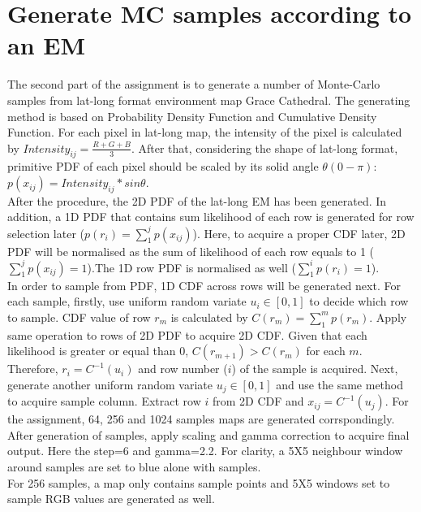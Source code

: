 \documentclass[12pt,twoside]{article}
\begin{document}
\newpage

\section{Generate MC samples according to an EM}
The second part of the assignment is to generate a number of Monte-Carlo samples from lat-long format environment map Grace Cathedral. The generating method is based on Probability Density Function and Cumulative Density Function. For each pixel in lat-long map, the intensity of the pixel is calculated by $Intensity_{ij} = \frac{R+G+B}{3}$. After that, considering the shape of lat-long format, primitive PDF of each pixel should be scaled by its solid angle $\theta (0-\pi)$: $p(x_{ij}) = Intensity_{ij} * sin\theta$. \\
After the procedure, the 2D PDF of the lat-long EM has been generated. In addition, a 1D PDF that contains sum likelihood of each row is generated for row selection later ($p(r_i) = \sum_1^jp(x_{ij})$). Here, to acquire a proper CDF later, 2D PDF will be normalised as the sum of likelihood of each row equals to 1 ($\sum_1^jp(x_{ij})=1$).The 1D row PDF is normalised as well ($\sum_1^ip(r_{i})=1$).\\
In order to sample from PDF, 1D CDF across rows will be generated next. For each sample, firstly, use uniform random variate $u_i\in [0,1]$ to decide which row to sample. CDF value of row $r_m$ is calculated by $C(r_m) = \sum_1^m p(r_m)$. Apply same operation to rows of 2D PDF to acquire 2D CDF. Given that each likelihood is greater or equal than 0, $C(r_{m+1}) > C(r_{m})$ for each $m$. Therefore, $r_i=C^{-1}(u_i)$ and row number ($i$) of the sample is acquired. Next, generate another uniform random variate $u_j\in [0,1]$ and use the same method to acquire sample column. Extract row $i$ from 2D CDF and $x_{ij} = C^{-1}(u_j)$. For the assignment, 64, 256 and 1024 samples maps are generated corrspondingly.\\
After generation of samples, apply scaling and gamma correction to acquire final output. Here the step=6 and gamma=2.2. For clarity, a 5X5 neighbour window around samples are set to blue alone with samples.\\
For 256 samples, a map only contains sample points and 5X5 windows set to sample RGB values are generated as well.\\
\end{document}
